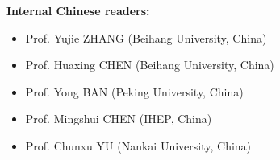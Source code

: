 \begin{Large}
\textbf{Internal Chinese readers:}
\end{Large}
\begin{itemize}
\item{Prof. Yujie ZHANG (Beihang University, China)}
\item{Prof. Huaxing CHEN (Beihang University, China)}
\item{Prof. Yong BAN (Peking University, China)}
\item{Prof. Mingshui CHEN (IHEP, China)}
\item{Prof. Chunxu YU (Nankai University, China)}
\end{itemize}

\newpage
